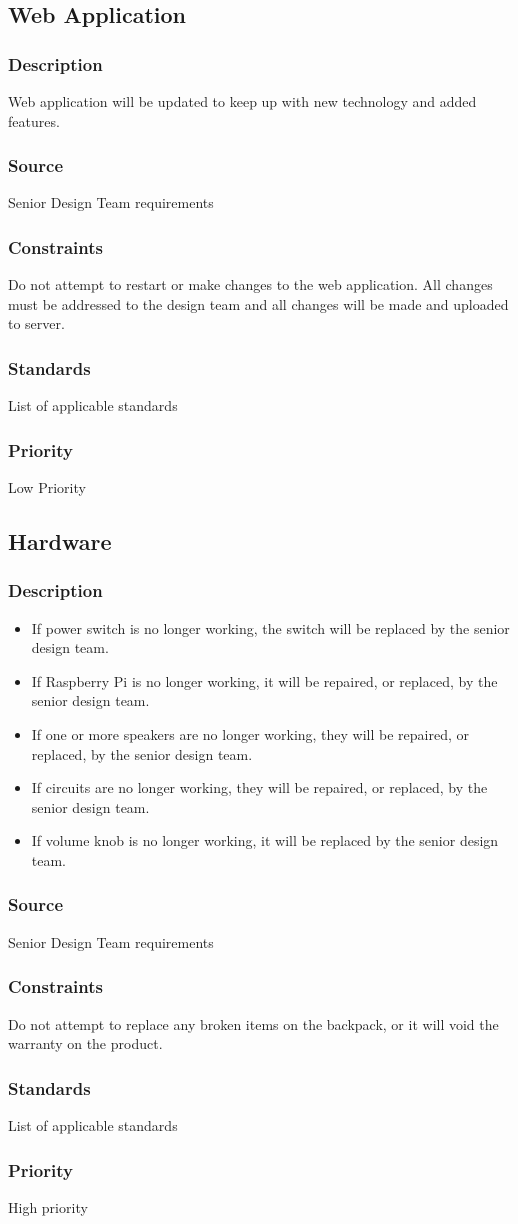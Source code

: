 \subsection{Web Application}
\subsubsection{Description}
Web application will be updated to keep up with new technology and added features.
\subsubsection{Source}
Senior Design Team requirements
\subsubsection{Constraints}
Do not attempt to restart or make changes to the web application. All changes must be addressed to the design team and all changes will be made and uploaded to server.
\subsubsection{Standards}
List of applicable standards
\subsubsection{Priority}
Low Priority

\subsection{Hardware}
\subsubsection{Description}
\begin{itemize}
\item If power switch is no longer working, the switch will be replaced by the senior design team.
\item If Raspberry Pi is no longer working, it will be repaired, or replaced, by the senior design team.
\item If one or more speakers are no longer working, they will be repaired, or replaced, by the senior design team.
\item If circuits are no longer working, they will be repaired, or replaced, by the senior design team.
\item If volume knob is no longer working, it will be replaced by the senior design team.
\end{itemize}
\subsubsection{Source}
Senior Design Team requirements
\subsubsection{Constraints}
Do not attempt to replace any broken items on the backpack, or it will void the warranty on the product.
\subsubsection{Standards}
List of applicable standards
\subsubsection{Priority}
High priority